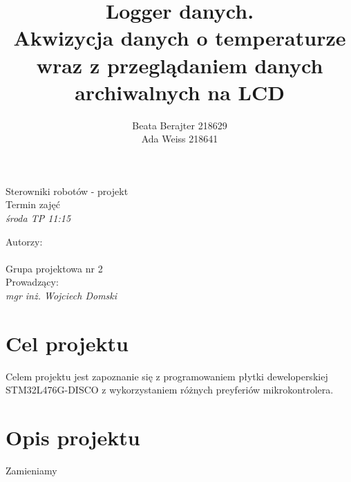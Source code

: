 \documentclass[a4paper,12pt]{article}
\author{Beata Berajter 218629\\
Ada Weiss 218641 }%
\title{Logger danych.\\Akwizycja danych o temperaturze wraz z przeglądaniem danych archiwalnych na LCD }
\makeatletter
\renewcommand{\maketitle}{\begin{titlepage}  
    \vspace*{1cm}
    \begin{center}
  Sterowniki robotów - projekt\\
Termin zajęć\\
\textit{środa TP 11:15}
    \end{center}
      \vspace{3cm}
    \begin{center}
     \LARGE \textsc {\@title}
         \end{center}
     \vspace{1cm}
    
    \begin{center}
    Autorzy:\\
   \textit{\@author} \\
\vspace{1cm}
Grupa projektowa nr 2\\
\vspace{2cm}
Prowadzący:\\
 \textit{mgr inż. Wojciech Domski}

     \end{center}
      \vspace{1cm}
    
    
    \vspace*{\stretch{6}}
    \begin{center}
    \@date
    \end{center}
  \end{titlepage}
}
\makeatother
\begin{document}
\newpage
\maketitle
\newpage
\tableofcontents

\newpage
\section{Cel projektu}
Celem projektu jest zapoznanie się z programowaniem płytki deweloperskiej STM32L476G-DISCO z wykorzystaniem różnych preyferiów mikrokontrolera.
\section{Opis projektu}
Zamieniamy
\end{document}
